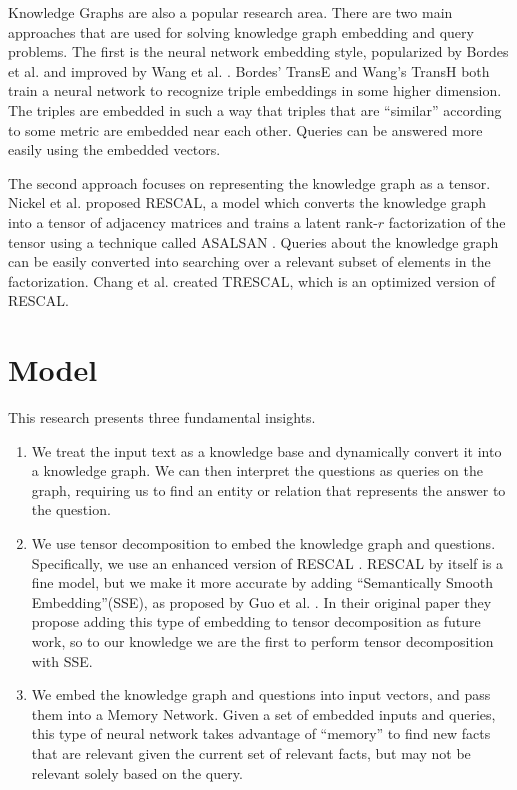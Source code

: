 \documentclass[pageno]{jpaper}
\begin{document}
Knowledge Graphs are also a popular research area. There are two main approaches
that are used for solving knowledge graph embedding and query problems. The
first is the neural network embedding style, popularized by Bordes et al.
\cite{Bordes2013} and improved by Wang et al. \cite{Wang2014}. Bordes' TransE
and Wang's TransH both train a neural network to recognize triple embeddings in
some higher dimension. The triples are embedded in such a way that triples that
are ``similar'' according to some metric are embedded near each other. Queries
can be answered more easily using the embedded vectors.

The second approach focuses on representing the knowledge graph as a tensor.
Nickel et al. \cite{Nickel2011} proposed RESCAL, a model which converts the
knowledge graph into a tensor of adjacency matrices and trains a latent rank-$r$
factorization of the tensor using a technique called ASALSAN \cite{Bader2007}.
Queries about the knowledge graph can be easily converted into searching over a
relevant subset of elements in the factorization. Chang et al. \cite{Chang2014}
created TRESCAL, which is an optimized version of RESCAL.

\section{Model}
\label{Model}

This research presents three fundamental insights. \\

\begin{enumerate}

    \item We treat the input text as a knowledge base and dynamically convert it
    into a knowledge graph. We can then interpret the questions as queries on
    the graph, requiring us to find an entity or relation that represents the
    answer to the question. \\

    \item We use tensor decomposition to embed the knowledge graph and
    questions. Specifically, we use an enhanced version of RESCAL
    \cite{Nickel2011}. RESCAL by itself is a fine model, but we make it more
    accurate by adding ``Semantically Smooth Embedding''(SSE), as proposed by
    Guo et al. \cite{Guo2015}. In their original paper they propose adding this
    type of embedding to tensor decomposition as future work, so to our
    knowledge we are the first to perform tensor decomposition with SSE. \\

    \item We embed the knowledge graph and questions into input vectors, and
    pass them into a Memory Network. Given a set of embedded inputs and queries,
    this type of neural network takes advantage of ``memory'' to find new facts
    that are relevant given the current set of relevant facts, but may not be
    relevant solely based on the query. \\

\end{enumerate}
\end{document}
